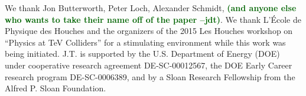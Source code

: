 \documentclass[11pt,letterpaper]{article}
\newcommand{\jdt}[1]{\textbf{\textcolor{darkgreen}{(#1 --jdt)}}}
\begin{document}
\begin{acknowledgments}
We thank Jon Butterworth, Peter Loch, Alexander Schmidt, \jdt{and anyone else who wants to take their name off of the paper}.  We thank L'\'{E}cole de Physique des Houches and the organizers of the 2015 Les Houches workshop on ``Physics at TeV Colliders'' for a stimulating environment while this work was being initiated.  J.T. is supported by the U.S. Department of Energy (DOE) under cooperative research agreement DE-SC-00012567, the DOE Early Career research program DE-SC-0006389, and by a Sloan Research Fellowship from the Alfred P. Sloan Foundation.

\end{acknowledgments}




\end{document}
